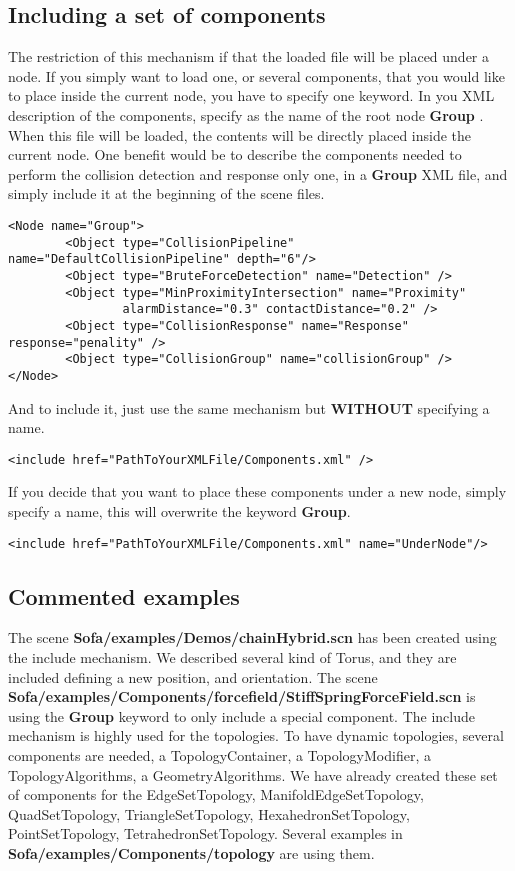 \subsection{Including a set of components}
The restriction of this mechanism if that the loaded file will be placed under a node. If you simply want to load one, or several components, that you would like to place inside the current node, you have to specify one keyword.
In you XML description of the components, specify as the name of the root node { \bf Group }. When this file will be loaded, the contents will be directly placed inside the current node.
One benefit would be to describe the components needed to perform the collision detection and response only one, in a { \bf Group } XML file, and simply include it at the beginning of the scene files.
\begin{verbatim}
<Node name="Group">
        <Object type="CollisionPipeline" name="DefaultCollisionPipeline" depth="6"/>
        <Object type="BruteForceDetection" name="Detection" />
        <Object type="MinProximityIntersection" name="Proximity" 
                alarmDistance="0.3" contactDistance="0.2" />
        <Object type="CollisionResponse" name="Response" response="penality" />
        <Object type="CollisionGroup" name="collisionGroup" />
</Node>
\end{verbatim}

And to include it, just use the same mechanism but { \bf WITHOUT} specifying a name.
\begin{verbatim}
<include href="PathToYourXMLFile/Components.xml" />
\end{verbatim}

If you decide that you want to place these components under a new node, simply specify a name, this will overwrite the keyword { \bf Group}.
\begin{verbatim}
<include href="PathToYourXMLFile/Components.xml" name="UnderNode"/>
\end{verbatim}

\subsection{Commented examples}
The scene { \bf Sofa/examples/Demos/chainHybrid.scn} has been created using the include mechanism. We described several kind of Torus, and they are included defining a new position, and orientation.
The scene { \bf Sofa/examples/Components/forcefield/StiffSpringForceField.scn} is using the { \bf Group} keyword to only include a special component.
The include mechanism is highly used for the topologies. To have dynamic topologies, several components are needed, a TopologyContainer, a TopologyModifier, a TopologyAlgorithms, a GeometryAlgorithms. We have already created these set of components for the EdgeSetTopology, ManifoldEdgeSetTopology, QuadSetTopology, TriangleSetTopology, HexahedronSetTopology, PointSetTopology, TetrahedronSetTopology. Several examples in {\bf Sofa/examples/Components/topology} are using them.
